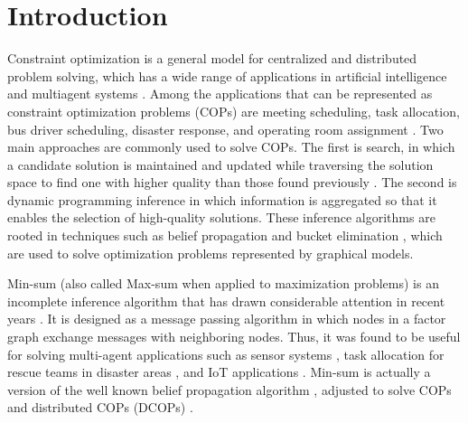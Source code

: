 \section{Introduction}\label{sec:intro}
Constraint optimization is a general model for centralized and distributed problem solving, which has a wide range of applications in artificial intelligence and multiagent systems \cite{YedidsionZF18,BoothB19,GolestanianBTB23}.
Among the applications that can be represented as constraint optimization problems (COPs) are meeting scheduling, task allocation, bus driver scheduling, disaster response, and operating room assignment \cite{csplib,NelkeOZ20,LavieCLZ23,GaonSZ23}.
Two main approaches are commonly used to solve COPs. The first is search, in which a candidate solution is maintained and updated while traversing the solution space to find one with higher quality than those found previously \cite{ModiSTY05,Zivan08,YeohFK10,LeeMS15}.
	The second is dynamic programming inference \cite{PetcuF05,RogersFSJ11,CohenGZ20} in which information is aggregated so that it enables the selection of high-quality solutions. These inference algorithms are rooted in techniques such as belief propagation and bucket elimination \cite{Pearl88,Dechter99}, which are used to solve optimization problems represented by graphical models.

	Min-sum (also called Max-sum when applied to maximization problems) is an incomplete inference algorithm that has drawn considerable attention in recent years \cite{FarinelliRPJ08,YuCHD17,CerquidesEPR18,DengA20}. It is designed as a message passing algorithm in which nodes in a factor graph exchange messages with neighboring nodes. Thus, it was found to be useful for solving multi-agent applications such as sensor systems \cite{TeacyFGPRJ08,StrandersFRJ09,YedidsionZF18}, task allocation for rescue teams in disaster areas \cite{RamchurnFMJ10}, and IoT applications \cite{RustPR16}.  Min-sum is actually a version of the well known belief propagation algorithm \cite{Pearl88,YanoverMW06}, adjusted to solve COPs and distributed COPs (DCOPs) \cite{BritoM10,GhoshKV15,KhanTYJ18,CohenLZ23}.

